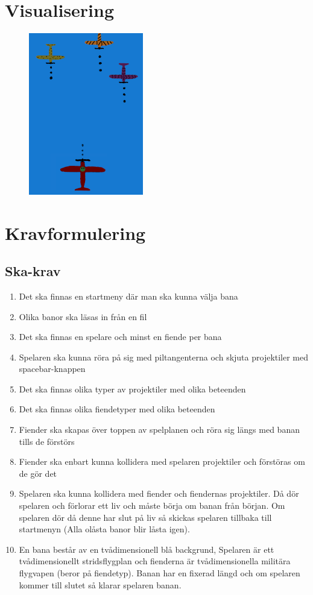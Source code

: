 \documentclass{TDP005mall}
\begin{document}
\section{Visualisering}


\begin{figure}[H]
  \centering
  \includegraphics[width=5cm]{Dogeater.png}
\end{figure}

\section{Kravformulering}
\subsection{Ska-krav}
\begin{enumerate}
  \item Det ska finnas en startmeny där man ska kunna välja bana  
  \item Olika banor ska läsas in från en fil
  \item Det ska finnas en spelare och minst en fiende per bana
  \item Spelaren ska kunna röra på sig med piltangenterna och skjuta projektiler med spacebar-knappen
  \item Det ska finnas olika typer av projektiler med olika beteenden
  \item Det ska finnas olika fiendetyper med olika beteenden 
  \item Fiender ska skapas över toppen av spelplanen och röra sig längs med banan tills de förstörs
  \item Fiender ska enbart kunna kollidera med spelaren projektiler och förstöras om de gör det
  \item Spelaren ska kunna kollidera med fiender och fiendernas projektiler. 
        Då dör spelaren och förlorar ett liv och måste börja om banan från början.
        Om spelaren dör då denne har slut på liv så skickas spelaren tillbaka till startmenyn (Alla olåsta banor blir låsta igen).
  \item En bana består av en tvådimensionell blå backgrund, Spelaren är ett tvådimensionellt stridsflygplan 
        och fienderna är tvådimensionella militära flygvapen (beror på fiendetyp).
        Banan har en fixerad längd och om spelaren kommer till slutet så klarar spelaren banan.
\end{enumerate}
\end{document}
